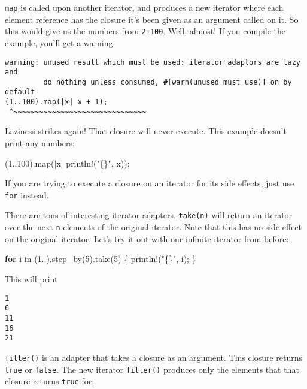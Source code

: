 \documentclass[a4paper,]{book}
\newenvironment{Shaded}{\begin{snugshade}}{\end{snugshade}}
\newcommand{\KeywordTok}[1]{\textcolor[rgb]{0.13,0.29,0.53}{\textbf{{#1}}}}
\newcommand{\DecValTok}[1]{\textcolor[rgb]{0.00,0.00,0.81}{{#1}}}
\newcommand{\StringTok}[1]{\textcolor[rgb]{0.31,0.60,0.02}{{#1}}}
\newcommand{\OtherTok}[1]{\textcolor[rgb]{0.56,0.35,0.01}{{#1}}}
\newcommand{\NormalTok}[1]{{#1}}
\begin{document}
\texttt{map} is called upon another iterator, and produces a new
iterator where each element reference has the closure it's been given as
an argument called on it. So this would give us the numbers from
\texttt{2-100}. Well, almost! If you compile the example, you'll get a
warning:

\begin{verbatim}
warning: unused result which must be used: iterator adaptors are lazy and
         do nothing unless consumed, #[warn(unused_must_use)] on by default
(1..100).map(|x| x + 1);
 ^~~~~~~~~~~~~~~~~~~~~~~~~~~~~~~~
\end{verbatim}

Laziness strikes again! That closure will never execute. This example
doesn't print any numbers:

\begin{Shaded}
\begin{Highlighting}[]
\NormalTok{(}\DecValTok{1.}\NormalTok{.}\DecValTok{100}\NormalTok{).map(|x| }\OtherTok{println!}\NormalTok{(}\StringTok{"\{\}"}\NormalTok{, x));}
\end{Highlighting}
\end{Shaded}

If you are trying to execute a closure on an iterator for its side
effects, just use \texttt{for} instead.

There are tons of interesting iterator adapters. \texttt{take(n)} will
return an iterator over the next \texttt{n} elements of the original
iterator. Note that this has no side effect on the original iterator.
Let's try it out with our infinite iterator from before:

\begin{Shaded}
\begin{Highlighting}[]
\KeywordTok{for} \NormalTok{i in (}\DecValTok{1.}\NormalTok{.).step_by(}\DecValTok{5}\NormalTok{).take(}\DecValTok{5}\NormalTok{) \{}
    \OtherTok{println!}\NormalTok{(}\StringTok{"\{\}"}\NormalTok{, i);}
\NormalTok{\}}
\end{Highlighting}
\end{Shaded}

This will print

\begin{verbatim}
1
6
11
16
21
\end{verbatim}

\texttt{filter()} is an adapter that takes a closure as an argument.
This closure returns \texttt{true} or \texttt{false}. The new iterator
\texttt{filter()} produces only the elements that that closure returns
\texttt{true} for:
\end{document}
